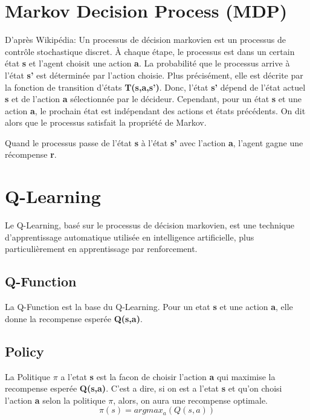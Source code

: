 \documentclass{article}
\begin{document}
\section{Markov Decision Process (MDP)}

D'après Wikipédia: Un processus de décision markovien est un processus de contrôle stochastique discret. À chaque étape, le processus est dans un certain état \textbf{s} et l'agent choisit une action \textbf{a}. La probabilité que le processus arrive à l'état \textbf{s'} est déterminée par l'action choisie. Plus précisément, elle est décrite par la fonction de transition d'états \textbf{T(s,a,s')}. Donc, l'état \textbf{s'} dépend de l'état actuel \textbf{s} et de l'action \textbf{a} sélectionnée par le décideur. Cependant, pour un état \textbf{s} et une action \textbf{a}, le prochain état est indépendant des actions et états précédents. On dit alors que le processus satisfait la propriété de Markov. 
\newline

Quand le processus passe de l'état \textbf{s} à l'état \textbf{s'} avec l'action \textbf{a}, l'agent gagne une récompense \textbf{r}. 

\section{Q-Learning}

Le Q-Learning, basé sur le processus de décision markovien, est une technique d'apprentissage automatique utilisée en intelligence artificielle, plus particulièrement en apprentissage par renforcement.

\subsection{Q-Function}

La Q-Function est la base du Q-Learning. Pour un etat \textbf{s} et une action \textbf{a}, elle donne la recompense esperée \textbf{Q(s,a)}.

\subsection{Policy}

La Politique $\pi$ a l'etat \textbf{s} est la facon de choisir l'action \textbf{a} qui maximise la recompense esperée \textbf{Q(s,a)}. C'est a dire, si on est a l'etat \textbf{s} et qu'on choisi l'action \textbf{a} selon la politique $\pi$, alors, on aura une recompense optimale.
$$\pi(s)=argmax_a(Q(s,a))$$
\end{document}

